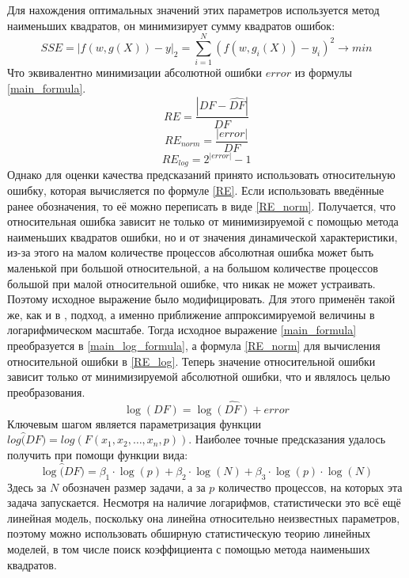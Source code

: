 		Для нахождения оптимальных значений этих параметров используется метод наименьших квадратов, он минимизирует сумму квадратов ошибок:
		\[
		SSE = |f(w, g(X)) - y|_2 = \sum_{i = 1}^{N}{(f(w, g_i(X)) - y_i)^2 \rightarrow min}
		\]
		Что эквивалентно минимизации абсолютной ошибки \(error\) из формулы \eqref{main_formula}.
		\begin{equation}
			\label{RE} 
			RE = \frac{|DF - \hat{DF}|}{DF}
		\end{equation}
		\begin{equation}
			\label{RE_norm}
			RE_{norm} = \frac{|error|}{DF}
		\end{equation}
		\begin{equation}
			\label{RE_log}
			RE_{log}= 2^{|error|} - 1
		\end{equation}
		Однако для оценки качества предсказаний принято использовать относительную ошибку, которая вычисляется по формуле \eqref{RE}. Если использовать введённые ранее обозначения, то её можно переписать в виде \eqref{RE_norm}. Получается, что относительная ошибка зависит не только от минимизируемой с помощью метода наименьших квадратов ошибки, но и от значения динамической характеристики, из-за этого на малом количестве процессов абсолютная ошибка может быть маленькой при большой относительной, а на большом количестве процессов большой при малой относительной ошибке, что никак не может устраивать. Поэтому исходное выражение было модифицировать. Для этого применён такой же, как и в \cite{log_main}, подход, а именно приближение аппроксимируемой величины в логарифмическом масштабе. Тогда исходное выражение \eqref{main_formula} преобразуется в \eqref{main_log_formula}, а формула \eqref{RE_norm} для вычисления относительной ошибки в \eqref{RE_log}. Теперь значение относительной ошибки зависит только от минимизируемой абсолютной ошибки, что и являлось целью преобразования.
		\begin{equation}\label{main_log_formula}
		\log{(DF)} = \log{\hat{(DF)}} + error
		\end{equation}
		Ключевым шагом является параметризация функции \(log{\hat(DF)} = log(F(x_1, x_2, \ldots, x_n, p))\). Наиболее точные предсказания удалось получить при помощи функции вида:
		\begin{equation}
		\log{\hat(DF)} = \beta_{1} \cdot \log{(p)} + \beta_{2} \cdot \log{(N)} + \beta_{3} \cdot \log{(p)} \cdot \log{(N)}
		\end{equation}
		Здесь за \(N\) обозначен размер задачи, а за \(p\) количество процессов, на которых эта задача запускается. Несмотря на наличие логарифмов, статистически это всё ещё линейная модель, поскольку она линейна относительно неизвестных параметров, поэтому можно использовать обширную статистическую теорию линейных моделей, в том числе поиск коэффициента с помощью метода наименьших квадратов.

